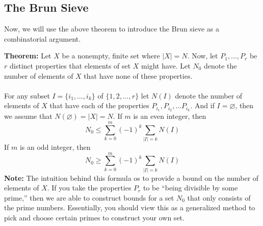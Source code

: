 \documentclass[8pt]{extarticle}
\begin{document}
\subsection{The Brun Sieve}
Now, we will use the above theorem to introduce the Brun sieve as a combinatorial argument.
\begin{boxedsection}
\textbf{Theorem:} Let $X$ be a nonempty, finite set where $|X| = N$. Now, let $P_1, \dots, P_r$ be $r$ distinct properties that elements of set $X$ might have. Let $N_0$ denote the number of elements of $X$ that have none of these properties. \\
\\
For any subset $I = \{i_1, \dots, i_k\}$ of $\{1,2,\dots, r\}$ let $N(I)$ denote the number of elements of $X$ that have each of the properties $P_{i_1}, P_{i_2}, \dots P_{i_k}$. And if $I = \varnothing$, then we assume that $N(\varnothing) = |X| = N$. If $m$ is an even integer, then
$$
N_0 \leq \sum_{k=0}^m (-1)^k \sum_{|I| = k} N(I)
$$
If $m$ is an odd integer, then 
$$
N_0 \geq \sum_{k=0}^m (-1)^k \sum_{|I| = k} N(I)
$$
\textbf{Note:} The intuition behind this formula os to provide a bound on the number of elements of $X$. If you take the properties $P_r$ to be ``being divisible by some prime,'' then we are able to construct bounds for a set $N_0$ that only consists of the prime numbers. Essentially, you should view this as a generalized method to pick and choose certain primes to construct your own set.
\end{boxedsection}
\pagebreak
\end{document}
